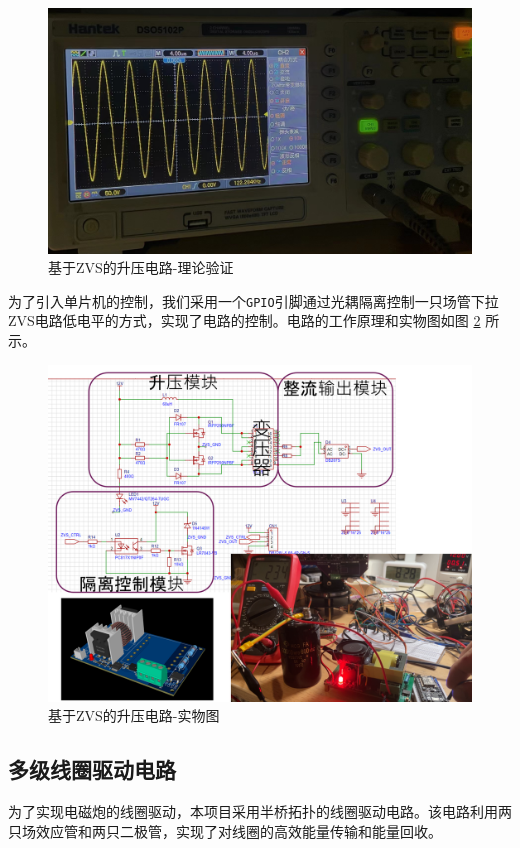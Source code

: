 \documentclass{article}
\begin{document}
\begin{figure}
\begin{minipage}[b]{.45\linewidth}
    \end{minipage}
    \begin{minipage}[b]{.45\linewidth}
        \includegraphics[width=\linewidth]{imgs/zvswave.png}
    \end{minipage}
    \caption{基于ZVS的升压电路-理论验证}
    \label{zvs}
\end{figure}
为了引入单片机的控制，我们采用一个\texttt{GPIO}引脚通过光耦隔离控制一只场管下拉ZVS电路低电平的方式，实现了电路的控制。电路的工作原理和实物图如图 \ref{zvs1} 所示。
\begin{figure}
    \centering
    \includegraphics[width=.9\linewidth]{imgs/zvsmake.png}
    \caption{基于ZVS的升压电路-实物图}
    \label{zvs1}
\end{figure}
\subsection{多级线圈驱动电路}
为了实现电磁炮的线圈驱动，本项目采用半桥拓扑的线圈驱动电路。该电路利用两只场效应管和两只二极管，实现了对线圈的高效能量传输和能量回收。
\end{document}
